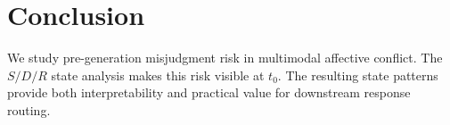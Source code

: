 \section{Conclusion}

We study pre-generation misjudgment risk in multimodal affective conflict.
The \(S/D/R\) state analysis makes this risk visible at \(t_0\).
The resulting state patterns provide both interpretability and practical value for downstream response routing.
